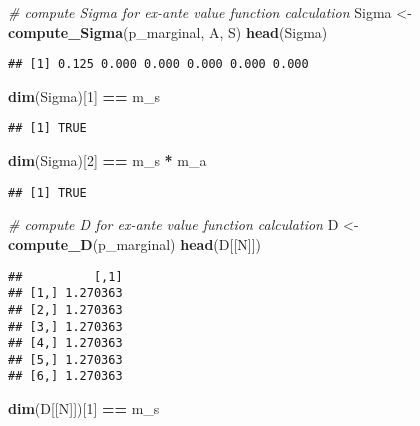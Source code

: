 \documentclass[
]{book}
\newenvironment{Shaded}{\begin{snugshade}}{\end{snugshade}}
\newcommand{\CommentTok}[1]{\textcolor[rgb]{0.56,0.35,0.01}{\textit{#1}}}
\newcommand{\DecValTok}[1]{\textcolor[rgb]{0.00,0.00,0.81}{#1}}
\newcommand{\KeywordTok}[1]{\textcolor[rgb]{0.13,0.29,0.53}{\textbf{#1}}}
\newcommand{\NormalTok}[1]{#1}
\newcommand{\OperatorTok}[1]{\textcolor[rgb]{0.81,0.36,0.00}{\textbf{#1}}}
\newcommand{\StringTok}[1]{\textcolor[rgb]{0.31,0.60,0.02}{#1}}
\begin{document}
\begin{Shaded}
\begin{Highlighting}[]
\CommentTok{# compute Sigma for ex-ante value function calculation}
\NormalTok{Sigma <-}\StringTok{ }\KeywordTok{compute_Sigma}\NormalTok{(p_marginal, A, S)}
\KeywordTok{head}\NormalTok{(Sigma)}
\end{Highlighting}
\end{Shaded}

\begin{verbatim}
## [1] 0.125 0.000 0.000 0.000 0.000 0.000
\end{verbatim}

\begin{Shaded}
\begin{Highlighting}[]
\KeywordTok{dim}\NormalTok{(Sigma)[}\DecValTok{1}\NormalTok{] }\OperatorTok{==}\StringTok{ }\NormalTok{m_s}
\end{Highlighting}
\end{Shaded}

\begin{verbatim}
## [1] TRUE
\end{verbatim}

\begin{Shaded}
\begin{Highlighting}[]
\KeywordTok{dim}\NormalTok{(Sigma)[}\DecValTok{2}\NormalTok{] }\OperatorTok{==}\StringTok{ }\NormalTok{m_s }\OperatorTok{*}\StringTok{ }\NormalTok{m_a}
\end{Highlighting}
\end{Shaded}

\begin{verbatim}
## [1] TRUE
\end{verbatim}

\begin{Shaded}
\begin{Highlighting}[]
\CommentTok{# compute D for ex-ante value function calculation}
\NormalTok{D <-}\StringTok{ }\KeywordTok{compute_D}\NormalTok{(p_marginal)}
\KeywordTok{head}\NormalTok{(D[[N]])}
\end{Highlighting}
\end{Shaded}

\begin{verbatim}
##          [,1]
## [1,] 1.270363
## [2,] 1.270363
## [3,] 1.270363
## [4,] 1.270363
## [5,] 1.270363
## [6,] 1.270363
\end{verbatim}

\begin{Shaded}
\begin{Highlighting}[]
\KeywordTok{dim}\NormalTok{(D[[N]])[}\DecValTok{1}\NormalTok{] }\OperatorTok{==}\StringTok{ }\NormalTok{m_s}
\end{Highlighting}
\end{Shaded}
\end{document}
